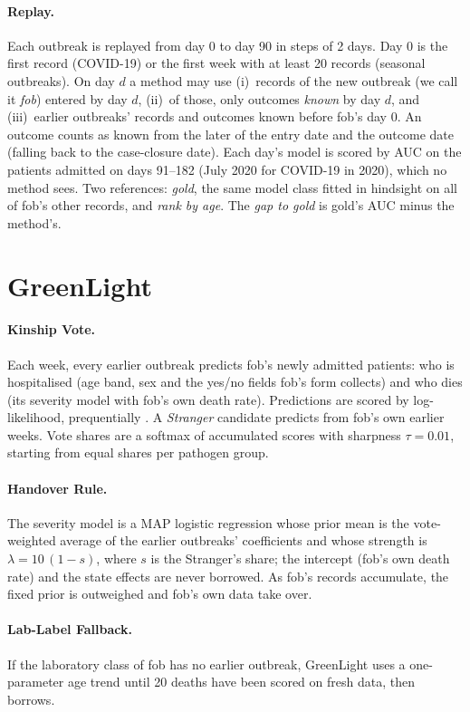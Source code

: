 \documentclass[10pt]{article}
\begin{document}


\paragraph{Replay.} Each outbreak is replayed from day 0 to day 90 in steps of 2 days. Day 0 is the first record
(COVID-19) or the first week with at least 20 records (seasonal outbreaks). On day $d$ a method may use (i)~records
of the new outbreak (we call it \emph{fob}) entered by day $d$, (ii)~of those, only outcomes \emph{known} by day $d$,
and (iii)~earlier outbreaks' records and outcomes known before fob's day 0. An outcome counts as known from the later
of the entry date and the outcome date (falling back to the case-closure date). Each day's model is scored by AUC on
the patients admitted on days 91--182 (July 2020 for COVID-19 in 2020), which no method sees. Two references:
\emph{gold}, the same model class fitted in hindsight on all of fob's other records, and \emph{rank by age}. The
\emph{gap to gold} is gold's AUC minus the method's.

\section{GreenLight}\label{sec:os}
\paragraph{Kinship Vote.} Each week, every earlier outbreak predicts fob's newly admitted patients: who is
hospitalised (age band, sex and the yes/no fields fob's form collects) and who dies (its severity model with fob's
own death rate). Predictions are scored by log-likelihood, prequentially \citep{dawid1984prequential,gneiting2007scoring}.
A \emph{Stranger} candidate predicts from fob's own earlier weeks. Vote shares are a softmax of accumulated scores
with sharpness $\tau=0.01$, starting from equal shares per pathogen group.
\paragraph{Handover Rule.} The severity model is a MAP logistic regression whose prior mean is the vote-weighted
average of the earlier outbreaks' coefficients and whose strength is $\lambda=10\,(1-s)$, where $s$ is the Stranger's
share; the intercept (fob's own death rate) and the state effects are never borrowed. As fob's records accumulate,
the fixed prior is outweighed and fob's own data take over.
\paragraph{Lab-Label Fallback.} If the laboratory class of fob has no earlier outbreak, GreenLight uses a one-parameter age
trend until 20 deaths have been scored on fresh data, then borrows.
\end{document}
